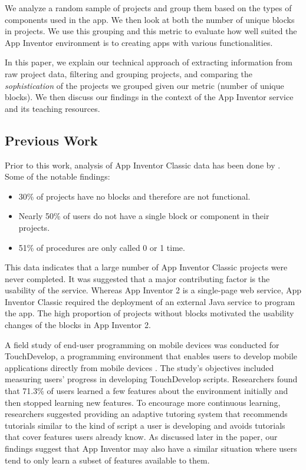 \documentclass[conference]{IEEEtran}
\begin{document}
We analyze a random sample of projects and group them based on the types of components used in the app. We then look at both the number of unique blocks in projects. We use this grouping and this metric to evaluate how well suited the App Inventor environment is to creating apps with various functionalities.

In this paper, we explain our technical approach of extracting information from raw project data, filtering and grouping projects, and comparing the \emph{sophistication} of the projects we grouped given our metric (number of unique blocks).  We then discuss our findings in the context of the App Inventor service and its teaching resources.


\subsection{Previous Work}
Prior to this work, analysis of App Inventor Classic data has been done by \cite{blocks:okerlund}. Some of the notable findings:
\begin{itemize}
	\item 30\% of projects have no blocks and therefore are not functional.
	\item Nearly 50\% of users do not have a single block or component in their projects.
	\item 51\% of procedures are only called 0 or 1 time.
\end{itemize}
This data indicates that a large number of App Inventor Classic projects were never completed. It was suggested that a major contributing factor is the usability of the service. Whereas App Inventor 2 is a single-page web service, App Inventor Classic required the deployment of an external Java service to program the app. The high proportion of projects without blocks motivated the usability changes of the blocks in App Inventor 2.

A field study of end-user programming on mobile devices was conducted for TouchDevelop, a programming environment that enables users to develop mobile applications directly from mobile devices \cite{TouchDevelop:Li}. The study's objectives included measuring users' progress in developing TouchDevelop scripts. Researchers found that 71.3\% of users learned a few features about the environment initially and then stopped learning new features. To encourage more continuous learning, researchers suggested providing an adaptive tutoring system that recommends tutorials similar to the kind of script a user is developing and avoids tutorials that cover features users already know. As discussed later in the paper, our findings suggest that App Inventor may also have a similar situation where users tend to only learn a subset of features available to them.
\end{document}
